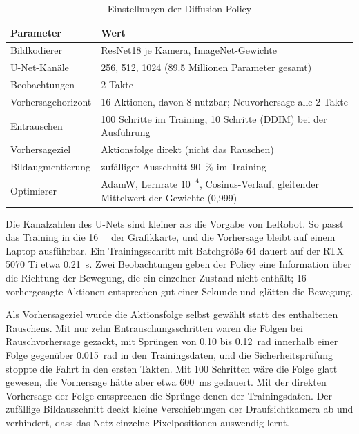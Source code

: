 \begin{table}[htbp]
  \centering
  \caption{Einstellungen der Diffusion Policy}
  \label{tab:m4-hyper}
  \begin{tabularx}{\textwidth}{@{}l X@{}}
    \toprule
    Parameter & Wert \\
    \midrule
    Bildkodierer & ResNet18 je Kamera, ImageNet-Gewichte \\
    U-Net-Kanäle & 256, 512, 1024 (\num{89.5} Millionen Parameter gesamt) \\
    Beobachtungen & 2 Takte \\
    Vorhersagehorizont & 16 Aktionen, davon 8 nutzbar; Neuvorhersage alle 2 Takte \\
    Entrauschen & 100 Schritte im Training, 10 Schritte (DDIM) bei der Ausführung \\
    Vorhersageziel & Aktionsfolge direkt (nicht das Rauschen) \\
    Bildaugmentierung & zufälliger Ausschnitt \SI{90}{\percent} im Training \\
    Optimierer & AdamW, Lernrate $10^{-4}$, Cosinus-Verlauf, gleitender Mittelwert der
                 Gewichte (0,999) \\
    \bottomrule
  \end{tabularx}
\end{table}

Die Kanalzahlen des U-Nets sind kleiner als die Vorgabe von LeRobot. So passt das Training in die
\SI{16}{\giga\byte} der Grafikkarte, und die Vorhersage bleibt auf einem Laptop ausführbar. Ein
Trainingsschritt mit Batchgröße 64 dauert auf der RTX 5070 Ti etwa \SI{0.21}{\second}. Zwei
Beobachtungen geben der Policy eine Information über die Richtung der Bewegung, die ein einzelner
Zustand nicht enthält; 16 vorhergesagte Aktionen entsprechen gut einer Sekunde und glätten die
Bewegung.

Als Vorhersageziel wurde die Aktionsfolge selbst gewählt statt des enthaltenen Rauschens. Mit nur
zehn Entrauschungsschritten waren die Folgen bei Rauschvorhersage gezackt, mit Sprüngen von
\num{0.10} bis \SI{0.12}{rad} innerhalb einer Folge gegenüber \SI{0.015}{rad} in den
Trainingsdaten, und die Sicherheitsprüfung stoppte die Fahrt in den ersten Takten. Mit 100
Schritten wäre die Folge glatt gewesen, die Vorhersage hätte aber etwa \SI{600}{\milli\second}
gedauert. Mit der direkten Vorhersage der Folge entsprechen die Sprünge denen der
Trainingsdaten. Der zufällige Bildausschnitt deckt kleine Verschiebungen der Draufsichtkamera ab
und verhindert, dass das Netz einzelne Pixelpositionen auswendig lernt.

